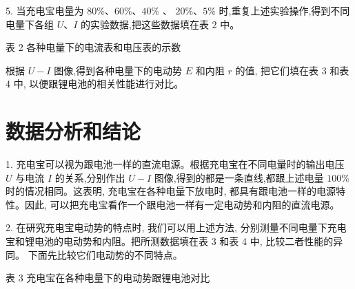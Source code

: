 \documentclass[10pt]{article}
\begin{document}
5. 当充电宝电量为 \({80}\% \text{、}{60}\% \text{、}{40}\%\) 、 \({20}\% \text{、}5\%\) 时,重复上述实验操作,得到不同电量下各组 \(U\text{、}I\) 的实验数据,把这些数据填在表 2 中。

表 2 各种电量下的电流表和电压表的示数

\begin{center}
\end{center}

根据 \(U - I\) 图像,得到各种电量下的电动势 \(E\) 和内阻 \(r\) 的值, 把它们填在表 3 和表 4 中, 以便跟锂电池的相关性能进行对比。

\section*{数据分析和结论}

1. 充电宝可以视为跟电池一样的直流电源。根据充电宝在不同电量时的输出电压 \(U\) 与电流 \(I\) 的关系,分别作出 \(U - I\) 图像,得到的都是一条直线,都跟上述电量 \({100}\%\) 时的情况相同。这表明, 充电宝在各种电量下放电时, 都具有跟电池一样的电源特性。因此, 可以把充电宝看作一个跟电池一样有一定电动势和内阻的直流电源。

2. 在研究充电宝电动势的特点时, 我们可以用上述方法, 分别测量不同电量下充电宝和锂电池的电动势和内阻。把所测数据填在表 3 和表 4 中, 比较二者性能的异同。 下面先比较它们电动势的不同特点。

表 3 充电宝在各种电量下的电动势跟锂电池对比

\begin{center}
\end{center}
\end{document}
